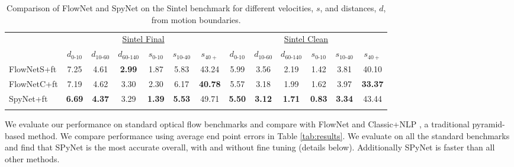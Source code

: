 \documentclass[10pt,twocolumn,letterpaper]{article}
\begin{document}
\begin{table}
\begin{center}
\begin{tabular}{lcccccccccccc}
\Xhline{4\arrayrulewidth}
\multicolumn{1}{l}{Method} & \multicolumn{6}{c}{\underline{\qquad \qquad \qquad \quad Sintel Final \quad \qquad \qquad \qquad}} & \multicolumn{6}{c}{\underline{\qquad \qquad \qquad \quad Sintel Clean \quad \qquad \qquad \qquad}} \\ 
 & $d_{0\text{-}10}$ & $d_{10\text{-}60}$ & $d_{60\text{-}140}$ & $s_{0\text{-}10}$ & $s_{10\text{-}40}$ & $s_{40+}$ & $d_{0\text{-}10}$ & $d_{10\text{-}60}$ & $d_{60\text{-}140}$ & $s_{0\text{-}10}$ & $s_{10\text{-}40}$ & $s_{40+}$\\ \hline
FlowNetS+ft & 7.25 & 4.61 &\textbf{ 2.99} & 1.87 & 5.83 & 43.24 & 5.99 & 3.56 & 2.19 & 1.42 & 3.81 & 40.10 \\ 
FlowNetC+ft & 7.19 & 4.62 & 3.30 & 2.30 & 6.17 & \textbf{40.78} & 5.57 & 3.18 & 1.99 & 1.62 & 3.97 & \textbf{33.37 }\\ 
SpyNet+ft & \textbf{6.69} & \textbf{4.37} & 3.29 &\textbf{ 1.39} & \textbf{5.53 }& 49.71 & \textbf{5.50} & \textbf{3.12} & \textbf{1.71 }& \textbf{0.83} & \textbf{3.34 }& 43.44 \\ \Xhline{4\arrayrulewidth}
\end{tabular}
\end{center}
\caption{Comparison of FlowNet and SpyNet on the Sintel benchmark for different velocities, $s$, and distances, $d$, from motion boundaries.}
\label{tab:sintel}
\end{table}

We evaluate our performance on standard optical flow benchmarks and compare with FlowNet \cite{dosovitskiy2015flownet}
and Classic+NLP \cite{sun2014quantitative}, a traditional pyramid-based method.
We compare performance using average end point errors in Table \ref{tab:results}.
We evaluate on all the standard benchmarks and find that 
SPyNet is the most accurate overall, with and without fine tuning (details below).
Additionally SPyNet is faster than all other methods. 
\end{document}

